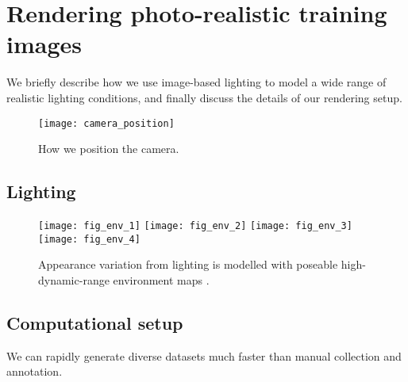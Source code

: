 
\section{Rendering photo-realistic training images}

We briefly describe how we use image-based lighting \cite{debevec2002image} to model a wide range of realistic lighting conditions, and finally discuss the details of our rendering setup.

\begin{figure}
    \texttt{[image: camera\_position]} \hfill
    \caption{How we position the camera.}
    \label{fig:participants}
\end{figure}

\subsection{Lighting}

\begin{figure}
    \texttt{[image: fig\_env\_1]} \hfill
    \texttt{[image: fig\_env\_2]} \hfill
    \texttt{[image: fig\_env\_3]} \hfill
    \texttt{[image: fig\_env\_4]}
    \caption{Appearance variation from lighting is modelled with poseable high-dynamic-range environment maps \cite{debevec2002image}.}
    \label{fig:participants}
\end{figure}

\subsection{Computational setup}

We can rapidly generate diverse datasets much faster than manual collection and annotation.